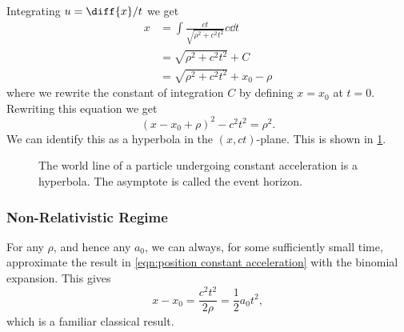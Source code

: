 \documentclass[fleqn]{NotesClass}
\begin{document}
    Integrating \(u = \diff{x}/{t}\) we get
    \begin{align}
        x &= \int \frac{ct}{\sqrt{\rho^2 + c^2t^2}}c\dd{t}\\
        &= \sqrt{\rho^2 + c^2t^2} + C\\
        &= \sqrt{\rho^2 + c^2t^2} + x_0 - \rho\label{eqn:position constant acceleration}
    \end{align}
    where we rewrite the constant of integration \(C\) by defining \(x = x_0\) at \(t = 0\).
    Rewriting this equation we get
    \begin{equation}\label{eqn:hyperbolic world line}
        (x - x_0 + \rho)^2 - c^2t^2 = \rho^2.
    \end{equation}
    We can identify this as a hyperbola in the \((x, ct)\)-plane.
    This is shown in \cref{fig:minkowski hyperbola}.
    
    \begin{figure}
        \caption{The world line of a particle undergoing constant acceleration is a hyperbola. The asymptote is called the event horizon.}
        \label{fig:minkowski hyperbola}
    \end{figure}
    
    \subsubsection{Non-Relativistic Regime}
    For any \(\rho\), and hence any \(a_0\), we can always, for some sufficiently small time, approximate the result in \cref{eqn:position constant acceleration} with the binomial expansion.
    This gives
    \begin{equation}
        x - x_0 = \frac{c^2t^2}{2\rho} = \frac{1}{2}a_0t^2,
    \end{equation}
    which is a familiar classical result.
    
\end{document}
